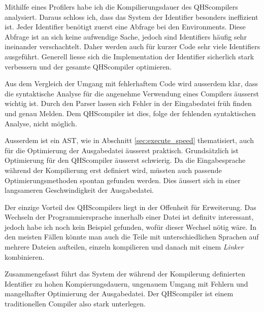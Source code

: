 Mithilfe eines Profilers habe ich die Kompilierungsdauer des QHScompilers analysiert. Daraus schloss ich, dass das System der Identifier besonders ineffizient ist. 
Jeder Identifier benötigt zuerst eine Abfrage bei den Environments. Diese Abfrage ist an sich keine aufwendige Sache, jedoch sind Identifiers häufig sehr ineinander verschachtelt.
Daher werden auch für kurzer Code sehr viele Identifiers ausgeführt. Generell liesse sich die Implementation der Identifier sicherlich stark verbessern und der gesamte QHScompiler optimieren.

Aus dem Vergleich der Umgang mit fehlerhaftem Code wird ausserdem klar, dass die syntaktische Analyse für die angenehme Verwendung eines Compilers äusserst wichtig ist.
Durch den Parser lassen sich Fehler in der Eingabedatei früh finden und genau Melden. Dem QHScompiler ist dies, folge der fehlenden syntaktischen Analyse, nicht möglich.

Ausserdem ist ein AST, wie in Abschnitt \ref{sec:execute_speed} thematisiert, auch für die Optimierung der Ausgabedatei äusserst praktisch.
Grundsätzlich ist Optimierung für den QHScompiler äusserst schwierig. Da die Eingabesprache während der Kompilierung erst definiert wird, müssten auch passende Optimierungsmethoden spontan gefunden werden.
Dies äussert sich in einer langsameren Geschwindigkeit der Ausgabedatei.

Der einzige Vorteil des QHScompilers liegt in der Offenheit für Erweiterung.
Das Wechseln der Programmiersprache innerhalb einer Datei ist definitv interessant, jedoch habe ich noch kein Beispiel gefunden, wofür dieser Wechsel nötig wäre.
In den meisten Fällen könnte man auch die Teile mit unterschiedlichen Sprachen auf mehrere Dateien aufteilen, einzeln kompilieren und danach mit einem \textit{Linker} kombinieren.

Zusammengefasst führt das System der während der Kompilerung definierten Identifier zu hohen Kompierungsdauern, ungenauem Umgang mit Fehlern und mangelhafter Optimierung der Ausgabedatei.
Der QHScompiler ist einem traditionellen Compiler also stark unterlegen.
